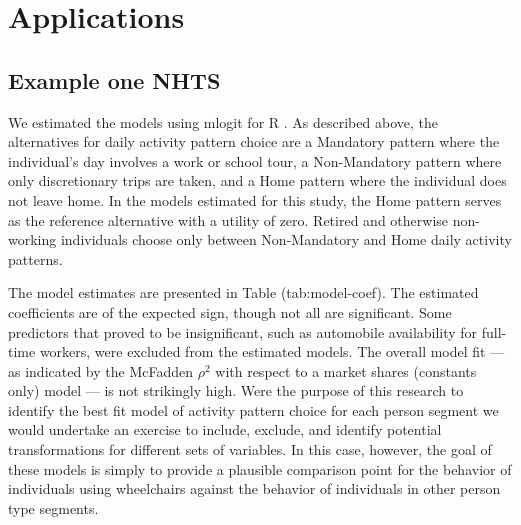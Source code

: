 \documentclass[3p, authoryear, review]{elsarticle} %
\begin{document}
\hypertarget{applications}{%
\section{Applications}\label{applications}}

\hypertarget{example-one-nhts}{%
\subsection{Example one NHTS}\label{example-one-nhts}}

We estimated the models using mlogit for R \cite{R, mlogit}. As described above, the
alternatives for daily activity pattern choice are a Mandatory pattern where the
individual's day involves a work or school tour, a Non-Mandatory pattern where
only discretionary trips are taken, and a Home pattern where the individual does
not leave home. In the models estimated for this study, the Home pattern serves
as the reference alternative with a utility of zero. Retired and otherwise
non-working individuals choose only between Non-Mandatory and Home daily activity
patterns.

The model estimates are presented in
Table \citet{ref}(tab:model-coef).
The estimated coefficients are of the expected sign, though not all are significant.
Some predictors that proved to be insignificant, such as automobile availability
for full-time workers, were excluded from the estimated models.
The overall model fit --- as indicated by the McFadden \(\rho^2\) with respect to
a market shares (constants only) model --- is not strikingly high. Were the purpose
of this research to identify the best fit model of activity pattern choice for
each person segment we would undertake an exercise to include, exclude, and identify
potential transformations for different sets of variables. In this case, however,
the goal of these models is simply to provide a plausible comparison point for
the behavior of individuals using wheelchairs against the behavior of individuals
in other person type segments.
\end{document}
